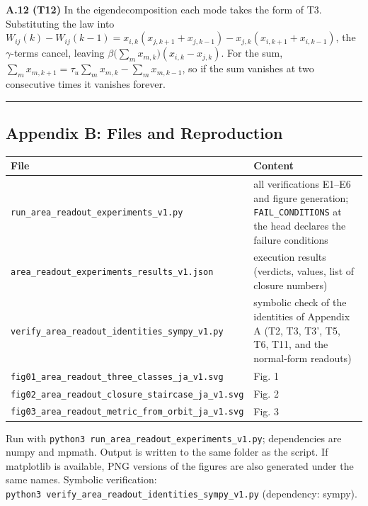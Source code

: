 \documentclass[
  a4paper,
]{article}
\newcounter{none} %
\begin{document}
\textbf{A.12 (T12)} In the eigendecomposition each mode takes the form
of T3. Substituting the law into
\(W_{ij}(k)-W_{ij}(k-1)=x_{i,k}(x_{j,k+1}+x_{j,k-1})-x_{j,k}(x_{i,k+1}+x_{i,k-1})\),
the \(\gamma\)-terms cancel, leaving
\(\beta\bigl(\sum_mx_{m,k}\bigr)(x_{i,k}-x_{j,k})\). For the sum,
\(\sum_mx_{m,k+1}=\tau_u\sum_mx_{m,k}-\sum_mx_{m,k-1}\), so if the sum
vanishes at two consecutive times it vanishes forever.

\begin{center}\rule{0.5\linewidth}{0.5pt}\end{center}

\subsection{Appendix B: Files and
Reproduction}\label{appendix-b-files-and-reproduction}

{\def\LTcaptype{none} %
\begin{longtable}[]{@{}
  >{\raggedright\arraybackslash}p{}
  >{\raggedright\arraybackslash}p{}@{}}
\toprule\noalign{}
\begin{minipage}[b]{\linewidth}\raggedright
File
\end{minipage} & \begin{minipage}[b]{\linewidth}\raggedright
Content
\end{minipage} \\
\midrule\noalign{}
\endhead
\bottomrule\noalign{}
\endlastfoot
\texttt{run\_area\_readout\_experiments\_v1.py} & all verifications
E1--E6 and figure generation; \texttt{FAIL\_CONDITIONS} at the head
declares the failure conditions \\
\texttt{area\_readout\_experiments\_results\_v1.json} & execution
results (verdicts, values, list of closure numbers) \\
\texttt{verify\_area\_readout\_identities\_sympy\_v1.py} & symbolic
check of the identities of Appendix A (T2, T3, T3', T5, T6, T11, and the
normal-form readouts) \\
\texttt{fig01\_area\_readout\_three\_classes\_ja\_v1.svg} & Fig. 1 \\
\texttt{fig02\_area\_readout\_closure\_staircase\_ja\_v1.svg} & Fig.
2 \\
\texttt{fig03\_area\_readout\_metric\_from\_orbit\_ja\_v1.svg} & Fig.
3 \\
\end{longtable}
}

Run with \texttt{python3\ run\_area\_readout\_experiments\_v1.py};
dependencies are numpy and mpmath. Output is written to the same folder
as the script. If matplotlib is available, PNG versions of the figures
are also generated under the same names. Symbolic verification:
\texttt{python3\ verify\_area\_readout\_identities\_sympy\_v1.py}
(dependency: sympy).
\end{document}
